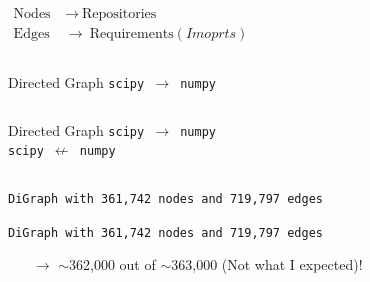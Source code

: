 \documentclass[fleqn]{beamer}
\begin{document}
    \begin{frame}
        \begin{columns}[T]
        \begin{align*}
            \text{Nodes}\ &\to\  \text{Repositories}\\
            \text{Edges}\ &\to\ \text{Requirements}(Imoprts)
        \end{align*}
        \end{columns}
    \end{frame}

    \begin{frame}
        \begin{columns}[T]
        \centering
        \begin{block}{\centering Directed Graph}
            \centering \texttt{scipy $\to$ numpy}\\
        \end{block}
        \end{columns}
    \end{frame}

    \begin{frame}
        \begin{columns}[T]
        \centering
        \begin{block}{\centering Directed Graph}
            \centering \texttt{scipy $\to$ numpy}\\
            \centering \texttt{scipy $\not\gets$ numpy}
        \end{block}
        \end{columns}
    \end{frame}

    \begin{frame}
        \centering
        \texttt{DiGraph with 361,742 nodes and 719,797 edges}\\
        \vspace{1cm}
    \end{frame}

    \begin{frame}
        \centering
        \texttt{DiGraph with 361,742 nodes and 719,797 edges}\\
        \vspace{1cm}
        \begin{itemize}
            \item[$\to$]\centering $\sim$362,000 out of $\sim$363,000  (Not what I expected)!
        \end{itemize}
    \end{frame}
\end{document}
